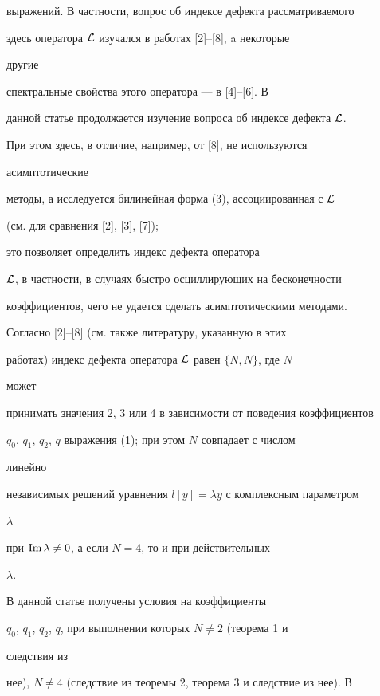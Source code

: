 выражений. В частности, вопрос об индексе дефекта рассматриваемого 


здесь оператора $\cal L$ изучался в работах [2]--[8], a некоторые 


другие 


спектральные свойства этого оператора --- в [4]--[6]. В 


данной статье продолжается изучение вопроса об индексе дефекта $\cal 


L$. 


При этом здесь, в отличие, например, от [8], не используются 


асимптотические 


методы, а исследуется билинейная форма (3), ассоциированная с $\cal L$ 


(см. для сравнения [2], [3], [7]); 


это позволяет определить индекс дефекта оператора 


$\cal L$, в частности, в случаях быстро осциллирующих на бесконечности 


коэффициентов, чего не удается сделать асимптотическими методами. 


 


Согласно [2]--[8] (см. также литературу, указанную в этих 


работах) индекс дефекта оператора $\cal L$ равен $\{N,N\}$, где $N$ 


может 


принимать значения 2, 3 или 4 в зависимости от поведения коэффициентов 


$q_0$, $q_1$, $q_2$, $q$ выражения (1); при этом $N$ совпадает с числом 


линейно 


независимых решений уравнения $l[y]=\lambda y$ с комплексным параметром 


$\lambda$ 


при $\text{Im\,}\lambda\ne0$, а если $N=4$, то и при действительных 


$\lambda$. 


 


В данной статье получены условия на коэффициенты 


$q_0$, $q_1$, $q_2$, $q$, при выполнении которых $N\ne2$ (теорема 1 и 


следствия из 


нее), $N\ne4$ (следствие из теоремы 2, теорема 3 и следствие из нее). В 


